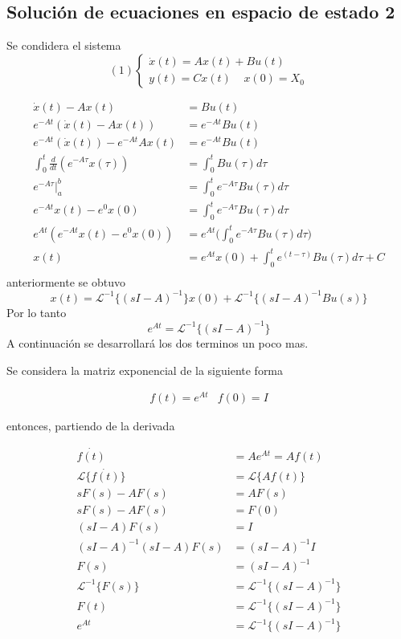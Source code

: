 \subsection{Solución de ecuaciones en espacio de estado 2}

Se condidera el sistema
\[
    (1)
    \left\{
        \begin{array}{lll}
            \dot{x}(t) = Ax(t) + Bu(t)\\
            y(t) = Cx(t) \;\;\;\;x(0)=X_{0}
        \end{array}
    \right.
\]

\[
    \begin{split}
        \dot{x}(t) -Ax(t) & = Bu(t)\\
        e^{-At} (\dot{x}(t)-Ax(t)) & = e^{-At}Bu(t)\\
        e^{-At} (\dot{x}(t)) - e^{-At}Ax(t) & = e^{-At}Bu(t)\\
        \int_{0}^{t} \frac{d}{dt} (e^{-A\tau}x(\tau)) & = \int_{0}^{t} Bu(\tau)d\tau\\
        e^{-A\tau}\Big|_a^b & = \int_{0}^{t} e^{-A\tau} Bu(\tau)d\tau\\
        e^{-At}x(t) - e^{0}x(0) & = \int_{0}^{t} e^{-A\tau} Bu(\tau)d\tau\\
        e^{At} (e^{-At}x(t) - e^{0}x(0)) & = e^{At} \Big(\int_{0}^{t} e^{-A\tau} Bu(\tau)d\tau\Big)\\
        x(t) & = e^{At}x(0) + \int_{0}^{t} e^{(t-\tau)}Bu(\tau)d\tau + C\\
    \end{split}
\]
anteriormente se obtuvo
\[
    x(t) = \mathcal{L}^{-1} \{ (sI-A)^{-1} \} x(0) + \mathcal{L}^{-1} \{ (sI-A)^{-1}Bu(s) \}
\]
Por lo tanto
\[
    e^{At} = \mathcal{L}^{-1} \{ (sI-A)^{-1} \}
\]
A continuación se desarrollará los dos terminos un poco mas.

Se considera la matriz exponencial de la siguiente forma 

\[
    \begin{matrix}
        f(t)=e^{At} & f(0)=I
    \end{matrix}
\]

entonces, partiendo de la derivada 

\[
    \begin{split}
        \dot{f(t)} & = Ae^{At} = Af(t)\\
        \mathcal{L} \{ \dot{f(t)} \} & = \mathcal{L} \{ Af(t) \}\\
        sF(s)-AF(s) & = AF(s)\\
        sF(s)-AF(s) & = F(0)\\
        (sI-A)F(s) & = I\\
        (sI-A)^{-1} (sI-A)F(s) & = (sI-A)^{-1}I\\
        F(s) & = (sI-A)^{-1}\\
        \mathcal{L}^{-1} \{ F(s) \} & = \mathcal{L}^{-1} \{ (sI-A)^{-1} \}\\
        F(t) & = \mathcal{L}^{-1} \{ (sI-A)^{-1} \}\\
        e^{At} & = \mathcal{L}^{-1} \{ (sI-A)^{-1} \}
    \end{split}
\]

